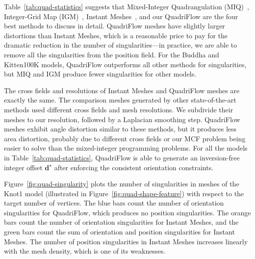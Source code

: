 Table~\ref{tab:quad-statistics} suggests that Mixed-Integer Quadrangulation (MIQ)~\cite{bommes2009mixed}, Integer-Grid Map (IGM)~\cite{bommes2013integer}, Instant Meshes~\cite{jakob2015instant}, and our QuadriFlow are the four best methods to discuss in detail. QuadriFlow meshes have slightly larger distortions than Instant Meshes, which is a reasonable price to pay for the dramatic reduction in the number of singularities---in practice, we are able to remove all the singularities from the position field. For the Buddha and Kitten100K models, QuadriFlow outperforms all other methods for singularities, but MIQ and IGM produce fewer singularities for other models.

The cross fields and resolutions of Instant Meshes and QuadriFlow meshes are exactly the same. The comparison meshes generated by other state-of-the-art methods used different cross fields and mesh resolutions. We subdivide their meshes to our resolution, followed by a Laplacian smoothing step. QuadriFlow meshes exhibit angle distortion similar to these methods, but it produces less area distortion, probably due to different cross fields or our MCF problem being easier to solve than the mixed-integer programming problems.  For all the models in Table~\ref{tab:quad-statistics}, QuadriFlow is able to generate an inversion-free integer offset ${\textbf{d}}^{\star}$ after enforcing the consistent orientation constraints. %

Figure~\ref{fig:quad-singularity} plots the number of singularities in meshes of the Knot1 model (illustrated in Figure~\ref{fig:quad-shape-feature}) with respect to the target number of vertices. The blue bars count the number of orientation singularities for QuadriFlow, which produces no position singularities. The orange bars count the number of orientation singularities for Instant Meshes, and the green bars count the sum of orientation and position singularities for Instant Meshes. The number of position singularities in Instant Meshes increases linearly with the mesh density, which is one of its weaknesses.


